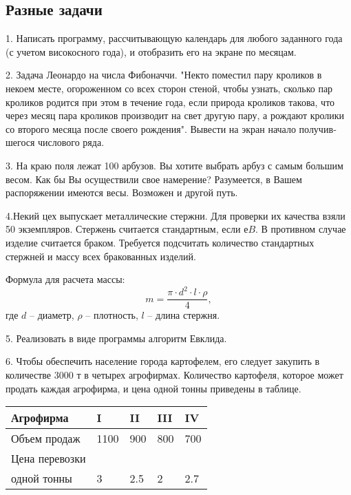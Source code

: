 \subsection{Разные задачи}

1. Написать программу, рассчитывающую календарь для любого заданного года (с учетом високосного года), и отобразить его на экране по месяцам.

2. Задача Леонардо на числа Фибоначчи. "Некто поместил пару кроликов в некоем месте, огороженном со всех сторон стеной, чтобы узнать, сколько пар кроликов родится при этом в течение года, если природа кроликов такова, что через месяц пара кроликов производит на свет другую пару, а рождают кролики со второго месяца после своего рождения". Вывести на экран начало получив­шегося числового ряда.

3. На краю поля лежат 100 арбузов. Вы хотите выбрать арбуз с самым большим весом. Как бы Вы осуществили свое намерение? Разумеется, в Вашем распоряжении имеются весы. Возможен и другой путь.
    
4.Некий цех выпускает металлические стержни. Для проверки их качества взяли 50 экземпляров. Стержень считается стандартным, если е$B$. В противном случае изделие считается браком. Требуется подсчитать количест­во стандартных стержней и массу всех бракованных изделий.

Формула для расчета массы:   $$m = \frac{\pi\cdot d^2\cdot l\cdot \rho}{4}, $$
где $d$ -- диаметр, $\rho$ -- плотность,   $l$ -- длина стержня.

5. Реализовать в виде программы алгоритм Евклида.

6. Чтобы обеспечить население города картофелем, его следу­ет закупить в количестве 3000 т в четырех агрофирмах. Количест­во картофеля, которое может продать каждая агрофирма, и цена одной тонны приведены в таблице.

\begin{center}
\begin{tabular}{ | l | l | l |  l |  l |} \hline
Агрофирма & I  &  II  &  III  &  IV   \\   \hline
Объем продаж & 1100  &  900  &  800  &  700   \\   \hline
Цена перевозки &    &     &     &      \\   
одной тонны & 3  &  2.5  &  2  &  2.7     \\   \hline
\end{tabular}
\end{center}
\vspace{5mm}

